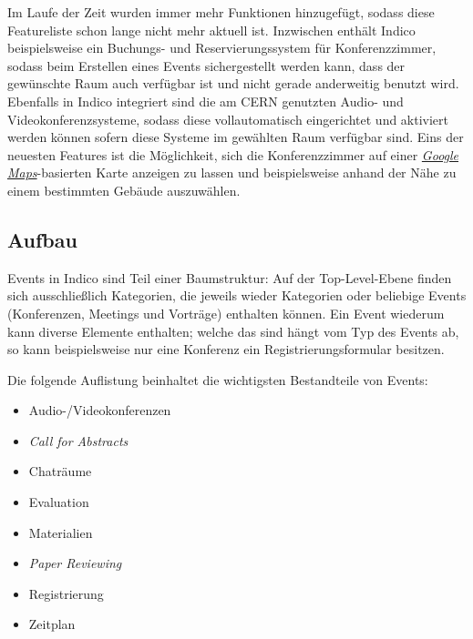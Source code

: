 Im Laufe der Zeit wurden immer mehr Funktionen hinzugefügt, sodass diese Featureliste schon lange
nicht mehr aktuell ist. Inzwischen enthält Indico beispielsweise ein Buchungs- und
Reservierungssystem für Konferenzzimmer, sodass beim Erstellen eines Events sichergestellt werden
kann, dass der gewünschte Raum auch verfügbar ist und nicht gerade anderweitig benutzt wird.
Ebenfalls in Indico integriert sind die am CERN genutzten Audio- und Videokonferenzsysteme, sodass diese
vollautomatisch eingerichtet und aktiviert werden können sofern diese Systeme im gewählten Raum
verfügbar sind. Eins der neuesten Features ist die Möglichkeit, sich die Konferenzzimmer auf einer
\href{http://maps.google.com/}{\emph{Google Maps}}-basierten Karte anzeigen zu lassen und
beispielsweise anhand der Nähe zu einem bestimmten Gebäude auszuwählen.

\subsection{Aufbau}
Events in Indico sind Teil einer Baumstruktur: Auf der Top-Level-Ebene finden sich ausschließlich
Kategorien, die jeweils wieder Kategorien oder beliebige Events (Konferenzen, Meetings und
Vorträge) enthalten können. Ein Event wiederum kann diverse Elemente enthalten; welche das sind
hängt vom Typ des Events ab, so kann beispielsweise nur eine Konferenz ein Registrierungsformular
besitzen.

\newpage
Die folgende Auflistung beinhaltet die wichtigsten Bestandteile von Events:
\begin{itemize}
\item Audio-/Videokonferenzen
\item \emph{Call for Abstracts}
\item Chaträume
\item Evaluation
\item Materialien
\item \emph{Paper Reviewing}
\item Registrierung
\item Zeitplan
\end{itemize}

